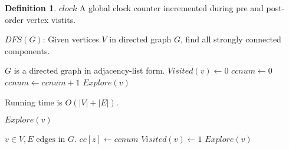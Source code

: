 \documentclass{article}
\theoremstyle{definition}
\newtheorem{definition}{Definition}[section]
\begin{document}
\begin{definition}{$clock$}
A global clock counter incremented during pre and post-order vertex vistits.
\end{definition}

\begin{algorithm}
\label{alg:dfs_dir}
\caption{$DFS(G)$: Given vertices $V$ in directed graph $G$, find all strongly connected components.}
\begin{algorithmic}[1]
\REQUIRE $G$ is a directed graph in adjacency-list form.
\STATE $Visited(v) \gets 0$
\ENDFOR
\STATE $ccnum \gets 0$
	\STATE $ccnum \gets ccnum + 1$
	\STATE $Explore(v)$
\ENDIF
\ENDFOR
\end{algorithmic}
 Running time is $O(|V|+|E|)$.
\end{algorithm}

\begin{algorithm}
\caption{$Explore(v)$}
\begin{algorithmic}[1]
\REQUIRE $v \in V, E \text{ edges in } G$.
\STATE $cc[z] \gets ccnum$  
\STATE $Visited(v) \gets 1$
	\STATE $Explore(v)$
\ENDIF
\ENDFOR
\end{algorithmic}
\end{algorithm}
\end{document}
